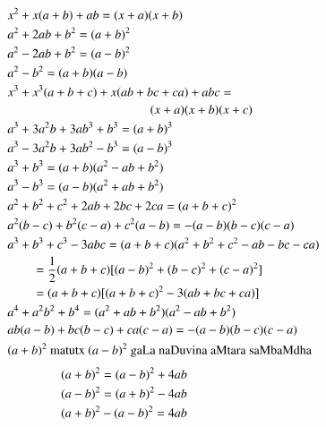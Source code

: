 \begin{align*}
& x^{2}+x(a+b)+ab=(x+a)(x+b)\\[-1pt]
& a^{2}+2ab+b^{2}=(a+b)^{2}\\[-1pt]
& a^{2}-2ab+b^{2}=(a-b)^{2}\\[-1pt]
& a^{2}-b^{2}=(a+b)(a-b)\\[-1pt]
& x^{3}+x^{3}(a+b+c)+x(ab+bc+ca)+abc=\\[-1pt]
& \hspace{4cm} (x+a)(x+b)(x+c)\\[-1pt]
& a^{3}+3a^{2}b+3ab^{3}+b^{3}=(a+b)^{3}\\[-1pt]
& a^{3}-3a^{2}b+3ab^{2}-b^{3}=(a-b)^{3}\\[-1pt]
& a^{3}+b^{3}=(a+b)(a^{2}-ab+b^{2})\\[-1pt]
& a^{3}-b^{3}=(a-b)(a^{2}+ab+b^{2})\\[-1pt]
& a^{2}+b^{2}+c^{2}+2ab+2bc+2ca=(a+b+c)^{2}\\[-1pt]
& a^{2}(b-c)+b^{2}(c-a)+c^{2}(a-b)=-(a-b)(b-c)(c-a)\\[-1pt]
& a^{3}+b^{3}+c^{3}-3abc=(a+b+c)(a^{2}+b^{2}+c^{2}-ab-bc-ca)\\[-1pt]
&\qquad = \frac{1}{2}(a+b+c)[(a-b)^{2}+(b-c)^{2}+(c-a)^{2}]\\[-1pt]
&\qquad = (a+b+c)[(a+b+c)^{2}-3(ab+bc+ca)]\\[-1pt]
& a^{4}+a^{2}b^{2}+b^{4}=(a^{2}+ab+b^{2})(a^{2}-ab+b^{2})\\[-1pt]
& ab(a-b)+bc(b-c)+ca(c-a)=-(a-b)(b-c)(c-a)\\
& (a+b)^{2} \text{~matutx $(a-b)^{2}$ gaLa naDuvina aMtara saMbaMdha}\\[3pt]
&\hspace{1.5cm} (a+b)^{2}=(a-b)^{2}+4ab\\[-1pt]
&\hspace{1.5cm} (a-b)^{2}=(a+b)^{2}-4ab\\[-1pt]
&\hspace{1.5cm} (a+b)^{2}-(a-b)^{2}=4ab
\end{align*}

